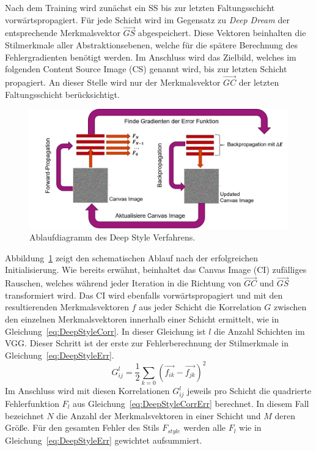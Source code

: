 \documentclass[times, 11pt,twocolumn]{article}
\begin{document}
Nach dem Training wird zunächst ein SS  bis zur letzten Faltungsschicht vorwärtspropagiert. Für jede Schicht wird im Gegensatz zu \textit{Deep Dream} der entsprechende Merkmalsvektor $\vec{GS}$ abgespeichert. Diese Vektoren beinhalten die Stilmerkmale aller Abstraktionsebenen, welche für die spätere Berechnung des Fehlergradienten benötigt werden. Im Anschluss wird das Zielbild, welches im folgenden Content Source Image (CS) genannt wird, bis zur letzten Schicht propagiert. An dieser Stelle wird nur der Merkmalsvektor $\vec{GC}$ der letzten Faltungsschicht berücksichtigt.

\begin{figure}
	\flushleft
	\includegraphics[width=\columnwidth]{Bilder/DeepStyle.jpg}
	\caption{Ablaufdiagramm des Deep Style Verfahrens.}
	\label{fig:DeepStyle}
\end{figure}
Abbildung~\ref{fig:DeepStyle} zeigt den schematischen Ablauf nach der erfolgreichen Initialisierung. Wie bereits erwähnt, beinhaltet das Canvas Image (CI) zufälliges Rauschen, welches während jeder Iteration in die Richtung von $\vec{GC}$ und $\vec{GS}$ transformiert wird. Das CI wird ebenfalls vorwärtspropagiert und mit den resultierenden Merkmalsvektoren $f$ aus jeder Schicht die Korrelation $G$ zwischen den einzelnen Merkmalsvektoren innerhalb einer Schicht ermittelt, wie in Gleichung~\ref{eq:DeepStyleCorr}. In dieser Gleichung ist $l$ die Anzahl Schichten im VGG. Dieser Schritt ist der erste zur Fehlerberechnung der Stilmerkmale in Gleichung~\ref{eq:DeepStyleErr}.
\footnotesize
\begin{equation}
G_{ij}^l= \frac{1}{2}\sum_{k=0} (\vec{f_{ik}}- \vec{f_{jk}})^2
\label{eq:DeepStyleCorr}
\end{equation}
\small
Im Anschluss wird mit diesen Korrelationen $G_{ij}^l$ jeweils  pro Schicht die quadrierte Fehlerfunktion $F_l$ aus Gleichung~\ref{eq:DeepStyleCorrErr} berechnet. In diesem Fall bezeichnet $N$ die Anzahl der Merkmalsvektoren in einer Schicht und $M$ deren Größe. Für den gesamten Fehler des Stils $F_{style}$ werden alle $F_l$ wie in Gleichung~\ref{eq:DeepStyleErr} gewichtet aufsummiert.
\end{document}
